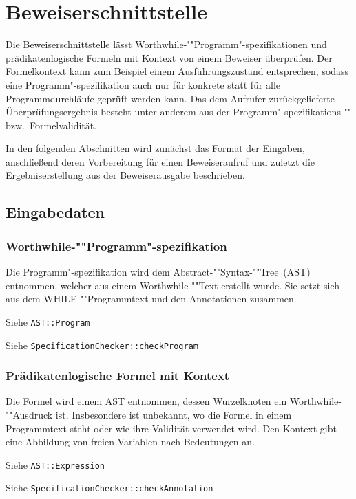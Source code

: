 \section{Beweiserschnittstelle}%

Die Beweiserschnittstelle lässt Worthwhile-""Programm"-spezifikationen
und prädikatenlogische Formeln mit Kontext von einem Beweiser
überprüfen. Der Formelkontext kann zum Beispiel einem
Ausführungszustand entsprechen, sodass eine Programm"-spezifikation
auch nur für konkrete statt für alle Programmdurchläufe geprüft werden
kann. Das dem Aufrufer zurückgelieferte Überprüfungsergebnis besteht
unter anderem aus der Programm"-spezifikations-"" bzw.\
Formelvalidität.

In den folgenden Abschnitten wird zunächst das Format der Eingaben,
anschließend deren Vorbereitung für einen Beweiseraufruf und zuletzt
die Ergebniserstellung aus der Beweiserausgabe beschrieben.%

\subsection{Eingabedaten}%

\subsubsection{Worthwhile-""Programm"-spezifikation}%

Die Programm"-spezifikation wird dem Abstract-""Syntax-""Tree~(AST)
entnommen, welcher aus einem Worthwhile-""Text erstellt wurde. Sie
setzt sich aus dem WHILE-""Programmtext und den Annotationen
zusammen.%

Siehe \texttt{AST::Program}%

Siehe \texttt{SpecificationChecker::checkProgram}%

\subsubsection{Prädikatenlogische Formel mit Kontext}%

Die Formel wird einem AST entnommen, dessen Wurzelknoten ein
Worthwhile-""Ausdruck ist. Insbesondere ist unbekannt, wo die Formel
in einem Programmtext steht oder wie ihre Validität verwendet wird.
Den Kontext gibt eine Abbildung von freien Variablen nach Bedeutungen
an.%

Siehe \texttt{AST::Expression}%

Siehe \texttt{SpecificationChecker::checkAnnotation}%

